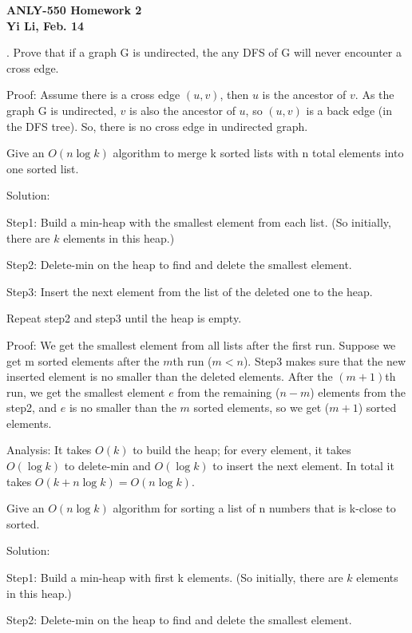 \documentclass[11pt]{article}
\begin{document}
\begin{center}
\large
\bf
ANLY-550 	Homework 2 \\[1pc]
\rm
\normalsize
Yi Li, Feb. 14 \\[1.5pc]  
\end{center}

\normalsize
{}. Prove that if a graph G is undirected, the any DFS of G will never encounter a cross edge.

\noindent
Proof: Assume there is a cross edge $(u, v)$, then $u$ is the ancestor of $v$. As the graph G is undirected, $v$ is also the ancestor of $u$, so $(u, v)$ is a back edge (in the DFS tree). So, there is no cross edge in undirected graph.


 Give an $O(n \log k)$ algorithm to merge k sorted lists with n total elements into one sorted list. 

\noindent
Solution: 

\noindent
Step1: Build a min-heap with the smallest element from each list. (So initially, there are $k$ elements in this heap.)

\noindent
Step2: Delete-min on the heap to find and delete the smallest element.

\noindent
Step3: Insert the next element from the list of the deleted one to the heap. 

\noindent
Repeat step2 and step3 until the heap is empty.

\noindent
Proof: We get the smallest element from all lists after the first run. Suppose we get m sorted elements after the $m$th run ($m<n$). Step3 makes sure that the new inserted element is no smaller than the deleted elements. After the $(m+1)$th run, we get the smallest element $e$ from the remaining ($n-m$) elements from the step2, and $e$ is no smaller than the $m$ sorted elements, so we get ($m+1$) sorted elements. 

\noindent
Analysis: It takes $O(k)$ to build the heap; for every element, it takes $O(\log k)$ to delete-min and $O(\log k)$ to insert the next element. In total it takes $O(k + n \log k) = O(n \log k)$.


 Give an $O(n \log k)$ algorithm for sorting a list of n numbers that is k-close to sorted.

\noindent
Solution: 

\noindent
Step1: Build a min-heap with first k elements. (So initially, there are $k$ elements in this heap.) 

\noindent
Step2: Delete-min on the heap to find and delete the smallest element.
\end{document}

